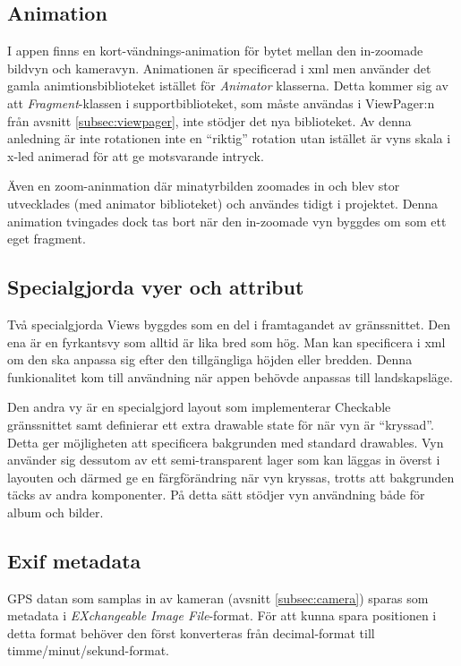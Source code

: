 \documentclass[11px, a4paper]{article}
\begin{document}
\subsection{Animation}
	I appen finns en kort-vändnings-animation för bytet mellan den in-zoomade bildvyn och kameravyn. Animationen är specificerad i xml men använder det gamla animtionsbiblioteket istället för \emph{Animator} klasserna. Detta kommer sig av att \emph{Fragment}-klassen i supportbiblioteket, som måste användas i ViewPager:n från avsnitt \ref{subsec:viewpager}, inte stödjer det nya biblioteket\cite{SupportAnimator}. Av denna anledning är inte rotationen inte en ``riktig'' rotation utan istället är vyns skala i x-led animerad för att ge motsvarande intryck.

	Även en zoom-aninmation där minatyrbilden zoomades in och blev stor utvecklades (med animator biblioteket) och användes tidigt i projektet. Denna animation tvingades dock tas bort när den in-zoomade vyn byggdes om som ett eget fragment.

\subsection{Specialgjorda vyer och attribut}
	Två specialgjorda Views byggdes som en del i framtagandet av gränssnittet. Den ena är en fyrkantsvy som alltid är lika bred som hög. Man kan specificera i xml om den ska anpassa sig efter den tillgängliga höjden eller bredden. Denna funkionalitet kom till användning när appen behövde anpassas till landskapsläge.

	Den andra vy är en specialgjord layout som implementerar Checkable gränssnittet samt definierar ett extra drawable state för när vyn är ``kryssad''. Detta ger möjligheten att specificera bakgrunden med standard drawables. Vyn använder sig dessutom av ett semi-transparent lager som kan läggas in överst i layouten och därmed ge en färgförändring när vyn kryssas, trotts att bakgrunden täcks av andra komponenter. På detta sätt stödjer vyn användning både för album och bilder.

\subsection{Exif metadata}
	GPS datan som samplas in av kameran (avsnitt \ref{subsec:camera}) sparas som metadata i \emph{EXchangeable Image File}-format. För att kunna spara positionen i detta format behöver den först konverteras från decimal-format till timme/minut/sekund-format.
\end{document}
